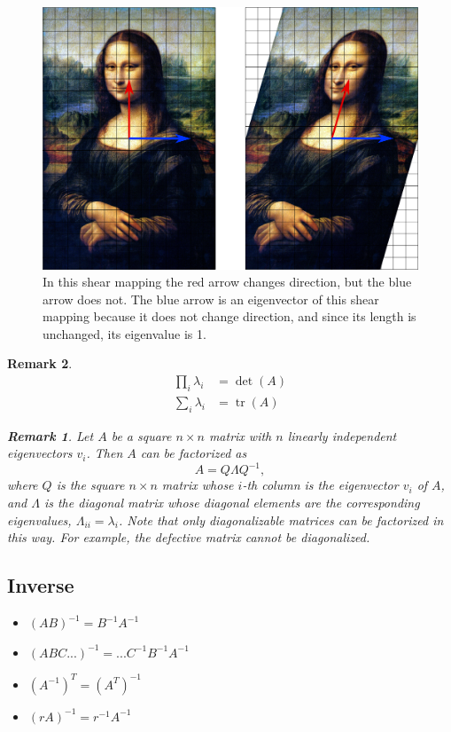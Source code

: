 \documentclass[a4paper]{article}
\theoremstyle{definition}
\theoremstyle{plain}
\newtheorem{remark}{Remark}
\newcounter{example}{Example}
\begin{document}
\begin{figure}[H]
    \centering
    \includegraphics[scale=0.05]{figure/monalisa.png}
    \caption{In this shear mapping the red arrow changes direction, but the blue arrow does not. The blue arrow is an eigenvector of this shear mapping because it does not change direction, and since its length is unchanged, its eigenvalue is 1.}
    \label{fig:my_label}
\end{figure}

\begin{remark}
\begin{align*}
    \prod_i\lambda_i&=\operatorname{det}(A)\\
    \sum_i \lambda_i&=\operatorname{tr}(A)
\end{align*}

\begin{remark}
Let $A$ be a square $n\times n$ matrix with $n$ linearly independent eigenvectors $v_i$. Then $A$ can be factorized as
\begin{equation*}
    A=Q\Lambda Q^{-1},
\end{equation*}
where $Q$ is the square $n\times n$ matrix whose $i$-th column is the eigenvector $v_i$ of $A$, and $\Lambda$ is the diagonal matrix whose diagonal elements are the corresponding eigenvalues, $\Lambda_{ii}= \lambda_i$. Note that only diagonalizable matrices can be factorized in this way. For example, the defective matrix cannot be diagonalized.
\end{remark}

\end{remark}

\subsection{Inverse}
\begin{itemize}
    \item $(AB)^{-1}=B^{-1}A^{-1}$
    \item $(ABC...)^{-1}=...C^{-1}B^{-1}A^{-1}$
    \item $(A^{-1})^T=(A^T)^{-1}$
    \item $(rA)^{-1}=r^{-1}A^{-1}$
\end{itemize}
\end{document}
